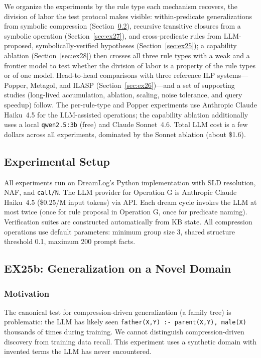 \documentclass[10pt,conference]{IEEEtran}
\begin{document}
We organize the experiments by the rule type each mechanism recovers, the division of labor the test protocol makes visible: within-predicate generalizations from symbolic compression (Section~\ref{sec:ex25b}), recursive transitive closures from a symbolic operation (Section~\ref{sec:ex27}), and cross-predicate rules from LLM-proposed, symbolically-verified hypotheses (Section~\ref{sec:ex25}); a capability ablation (Section~\ref{sec:ex28}) then crosses all three rule types with a weak and a frontier model to test whether the division of labor is a property of the rule types or of one model. Head-to-head comparisons with three reference ILP systems---Popper, Metagol, and ILASP (Section~\ref{sec:ex26})---and a set of supporting studies (long-lived accumulation, ablation, scaling, noise tolerance, and query speedup) follow. The per-rule-type and Popper experiments use Anthropic Claude Haiku~4.5 for the LLM-assisted operations; the capability ablation additionally uses a local \texttt{qwen2.5:3b} (free) and Claude Sonnet~4.6. Total LLM cost is a few dollars across all experiments, dominated by the Sonnet ablation (about \$1.6).

\subsection{Experimental Setup}

All experiments run on DreamLog's Python implementation with SLD resolution, NAF, and \texttt{call/N}. The LLM provider for Operation G is Anthropic Claude Haiku~4.5 (\$0.25/M input tokens) via API. Each dream cycle invokes the LLM at most twice (once for rule proposal in Operation G, once for predicate naming). Verification suites are constructed automatically from KB state. All compression operations use default parameters: minimum group size 3, shared structure threshold 0.1, maximum 200 prompt facts.

\subsection{EX25b: Generalization on a Novel Domain}
\label{sec:ex25b}

\subsubsection{Motivation}
The canonical test for compression-driven generalization (a family tree) is problematic: the LLM has likely seen \texttt{father(X,Y) :- parent(X,Y), male(X)} thousands of times during training. We cannot distinguish compression-driven discovery from training data recall. This experiment uses a synthetic domain with invented terms the LLM has never encountered.
\end{document}

